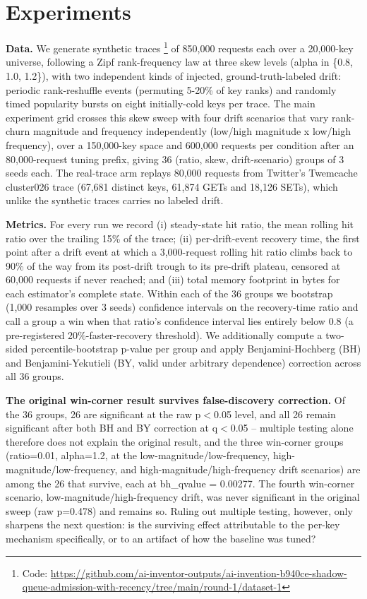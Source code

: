 \documentclass[11pt,letterpaper]{article}
\begin{document}
\section{Experiments}

\textbf{Data.} We generate synthetic traces \footnote{Code: \url{https://github.com/ai-inventor-outputs/ai-invention-b940ce-shadow-queue-admission-with-recency/tree/main/round-1/dataset-1}} of 850,000 requests each over a 20,000-key universe, following a Zipf rank-frequency law at three skew levels (alpha in \{0.8, 1.0, 1.2\}), with two independent kinds of injected, ground-truth-labeled drift: periodic rank-reshuffle events (permuting 5-20\% of key ranks) and randomly timed popularity bursts on eight initially-cold keys per trace. The main experiment grid crosses this skew sweep with four drift scenarios that vary rank-churn magnitude and frequency independently (low/high magnitude x low/high frequency), over a 150,000-key space and 600,000 requests per condition after an 80,000-request tuning prefix, giving 36 (ratio, skew, drift-scenario) groups of 3 seeds each. The real-trace arm replays 80,000 requests from Twitter's Twemcache cluster026 trace (67,681 distinct keys, 61,874 GETs and 18,126 SETs), which unlike the synthetic traces carries no labeled drift.

\textbf{Metrics.} For every run we record (i) steady-state hit ratio, the mean rolling hit ratio over the trailing 15\% of the trace; (ii) per-drift-event recovery time, the first point after a drift event at which a 3,000-request rolling hit ratio climbs back to 90\% of the way from its post-drift trough to its pre-drift plateau, censored at 60,000 requests if never reached; and (iii) total memory footprint in bytes for each estimator's complete state. Within each of the 36 groups we bootstrap (1,000 resamples over 3 seeds) confidence intervals on the recovery-time ratio and call a group a win when that ratio's confidence interval lies entirely below 0.8 (a pre-registered 20\%-faster-recovery threshold). We additionally compute a two-sided percentile-bootstrap p-value per group and apply Benjamini-Hochberg (BH) and Benjamini-Yekutieli (BY, valid under arbitrary dependence) correction across all 36 groups.

\textbf{The original win-corner result survives false-discovery correction.} Of the 36 groups, 26 are significant at the raw p$<$0.05 level, and all 26 remain significant after both BH and BY correction at q$<$0.05 -- multiple testing alone therefore does not explain the original result, and the three win-corner groups (ratio=0.01, alpha=1.2, at the low-magnitude/low-frequency, high-magnitude/low-frequency, and high-magnitude/high-frequency drift scenarios) are among the 26 that survive, each at bh\_qvalue = 0.00277. The fourth win-corner scenario, low-magnitude/high-frequency drift, was never significant in the original sweep (raw p=0.478) and remains so. Ruling out multiple testing, however, only sharpens the next question: is the surviving effect attributable to the per-key mechanism specifically, or to an artifact of how the baseline was tuned?
\end{document}
